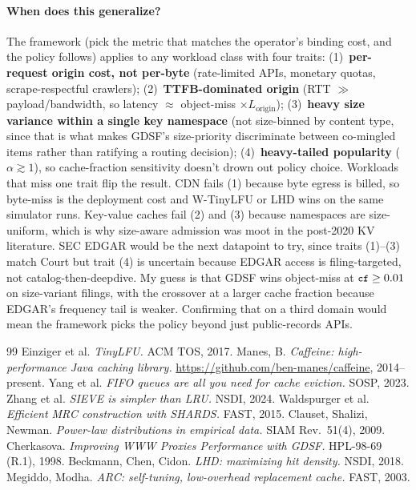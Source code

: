 \documentclass[letterpaper,twocolumn,10pt]{article}
\newcommand{\code}[1]{\texttt{\small #1}}
\begin{document}
\paragraph{When does this generalize?} The framework (pick the
metric that matches the operator's binding cost, and the policy
follows) applies to any workload class with four traits:
(1)~\textbf{per-request origin cost, not per-byte} (rate-limited
APIs, monetary quotas, scrape-respectful crawlers);
(2)~\textbf{TTFB-dominated origin} (RTT $\gg$ payload/bandwidth, so
latency $\approx$ object-miss $\times L_{\text{origin}}$);
(3)~\textbf{heavy size variance within a single key namespace} (not
size-binned by content type, since that is what makes GDSF's
size-priority discriminate between co-mingled items rather than
ratifying a routing decision);
(4)~\textbf{heavy-tailed popularity} ($\alpha \gtrsim 1$), so
cache-fraction sensitivity doesn't drown out policy choice.
Workloads that miss one trait flip the result. CDN fails (1)
because byte egress is billed, so byte-miss is the deployment cost
and W-TinyLFU or LHD wins on the same simulator runs. Key-value
caches fail (2) and (3) because namespaces are size-uniform, which
is why size-aware admission was moot in the post-2020 KV
literature. SEC EDGAR would be the next datapoint to try, since traits
(1)--(3) match Court but trait (4) is uncertain because EDGAR
access is filing-targeted, not catalog-then-deepdive. My guess is
that GDSF wins object-miss at $\code{cf} \geq 0.01$ on size-variant
filings, with the crossover at a larger cache fraction because
EDGAR's frequency tail is weaker. Confirming that on a third
domain would mean the framework picks the policy beyond just
public-records APIs.
\begin{thebibliography}{99}
\scriptsize
\setlength{\itemsep}{0pt}
\setlength{\parsep}{0pt}
 Einziger et al. \textit{TinyLFU.} ACM TOS, 2017.
 Manes, B. \textit{Caffeine: high-performance Java caching library.} \url{https://github.com/ben-manes/caffeine}, 2014--present.
 Yang et al. \textit{FIFO queues are all you need for cache eviction.} SOSP, 2023.
 Zhang et al. \textit{SIEVE is simpler than LRU.} NSDI, 2024.
 Waldspurger et al. \textit{Efficient MRC construction with SHARDS.} FAST, 2015.
 Clauset, Shalizi, Newman. \textit{Power-law distributions in empirical data.} SIAM Rev.\ 51(4), 2009.
 Cherkasova. \textit{Improving WWW Proxies Performance with GDSF.} HPL-98-69 (R.1), 1998.
 Beckmann, Chen, Cidon. \textit{LHD: maximizing hit density.} NSDI, 2018.
 Megiddo, Modha. \textit{ARC: self-tuning, low-overhead replacement cache.} FAST, 2003.
\end{thebibliography}
\end{document}
